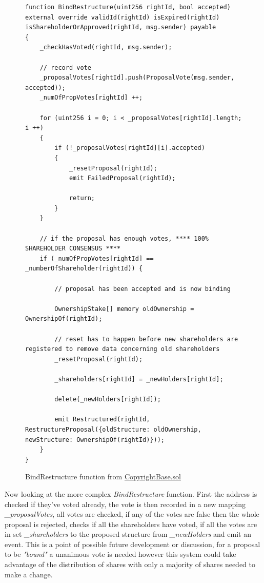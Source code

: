 \begin{figure}[H]
\caption{BindRestructure function from \href{https://github.com/MrHarrisonBarker/CRPL/blob/main/CRPL.Contracts/contracts/Copyrights/CopyrightBase.sol}{CopyrightBase.sol}}
\centering
\begin{lstlisting}[language=Solidity]
function BindRestructure(uint256 rightId, bool accepted) external override validId(rightId) isExpired(rightId) isShareholderOrApproved(rightId, msg.sender) payable 
{
	_checkHasVoted(rightId, msg.sender);
     
	// record vote
	_proposalVotes[rightId].push(ProposalVote(msg.sender, accepted));
	_numOfPropVotes[rightId] ++;

	for (uint256 i = 0; i < _proposalVotes[rightId].length; i ++) 
	{
		if (!_proposalVotes[rightId][i].accepted) 
		{
			_resetProposal(rightId);
			emit FailedProposal(rightId);

			return;
		}
	}

	// if the proposal has enough votes, **** 100% SHAREHOLDER CONSENSUS ****
	if (_numOfPropVotes[rightId] == _numberOfShareholder(rightId)) {
            
		// proposal has been accepted and is now binding

		OwnershipStake[] memory oldOwnership = OwnershipOf(rightId);
            
		// reset has to happen before new shareholders are registered to remove data concerning old shareholders
		_resetProposal(rightId);

		_shareholders[rightId] = _newHolders[rightId];

		delete(_newHolders[rightId]);

		emit Restructured(rightId, RestructureProposal({oldStructure: oldOwnership, newStructure: OwnershipOf(rightId)}));
	}
}	
\end{lstlisting}
\end{figure}

Now looking at the more complex \textit{BindRestructure} function. First the address is checked if they've voted already, the vote is then recorded in a new mapping \textit{\_proposalVotes}, all votes are checked, if any of the votes are false then the whole proposal is rejected, checks if all the shareholders have voted, if all the votes are in set \textit{\_shareholders} to the proposed structure from \textit{\_newHolders} and emit an event.
\br
This is a point of possible future development or discussion, for a proposal to be \textit{"bound"} a unanimous vote is needed however this system could take advantage of the distribution of shares with only a majority of shares needed to make a change.

